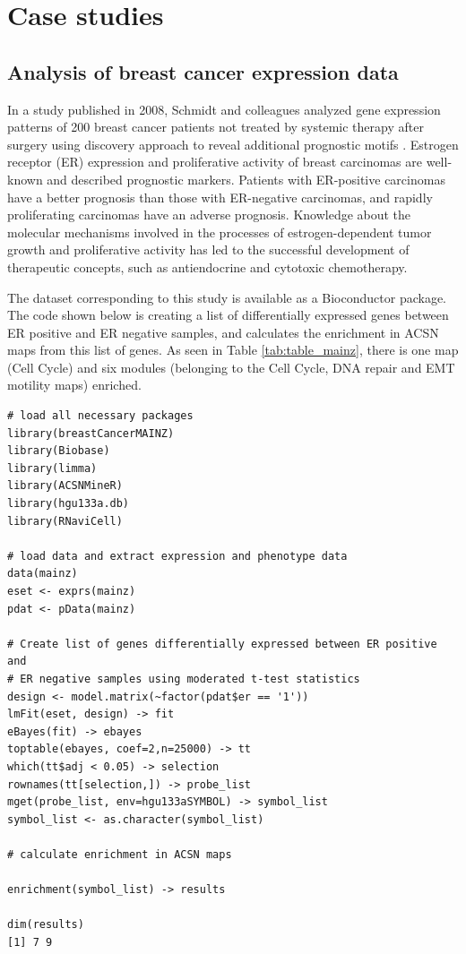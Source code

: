 \documentclass[article]{jss}
\begin{document}
\section[Case studies]{Case studies}

\subsection{Analysis of breast cancer expression data}
In a study published in 2008, Schmidt and colleagues analyzed gene expression
patterns of 200 breast cancer patients not treated by systemic therapy after
surgery using discovery approach to reveal additional prognostic motifs
\citep{schmidt2008humoral}. Estrogen receptor (ER) expression and proliferative
activity of breast carcinomas are well-known and described prognostic markers.
Patients with ER-positive carcinomas have a better prognosis than those with
ER-negative carcinomas, and rapidly proliferating carcinomas have an adverse
prognosis. Knowledge about the molecular mechanisms involved in the
processes of estrogen-dependent tumor growth and proliferative activity has led
to the successful development of therapeutic concepts, such as  antiendocrine and
cytotoxic chemotherapy. 

The dataset corresponding to this study is available as a Bioconductor package.
The code shown below is creating a list of differentially expressed genes
between ER positive and ER negative samples, and calculates the enrichment in
ACSN maps from this list of genes. As seen in Table \ref{tab:table_mainz},
there is one map (Cell Cycle) and six modules (belonging to the Cell Cycle, DNA
repair and EMT motility maps) enriched. 

\begin{verbatim}
# load all necessary packages
library(breastCancerMAINZ)
library(Biobase)
library(limma)
library(ACSNMineR)
library(hgu133a.db)
library(RNaviCell)

# load data and extract expression and phenotype data 
data(mainz)
eset <- exprs(mainz)
pdat <- pData(mainz)

# Create list of genes differentially expressed between ER positive and 
# ER negative samples using moderated t-test statistics 
design <- model.matrix(~factor(pdat$er == '1'))
lmFit(eset, design) -> fit
eBayes(fit) -> ebayes
toptable(ebayes, coef=2,n=25000) -> tt
which(tt$adj < 0.05) -> selection
rownames(tt[selection,]) -> probe_list
mget(probe_list, env=hgu133aSYMBOL) -> symbol_list
symbol_list <- as.character(symbol_list)

# calculate enrichment in ACSN maps 

enrichment(symbol_list) -> results

dim(results)
[1] 7 9
\end{verbatim}
\end{document}
